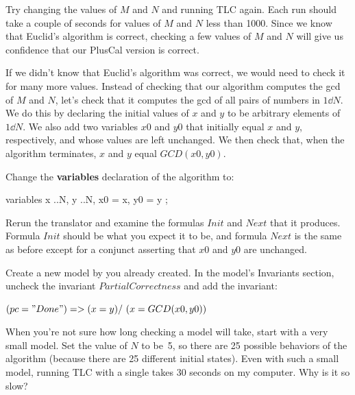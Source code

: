 \documentclass[fleqn,leqno]{article}
\begin{document}
Try changing the values of $M$ and $N$ and running TLC again.  Each
run should take a couple of seconds for values of $M$ and $N$ less
than 1000.  Since we know that Euclid's algorithm is correct, checking
a few values of $M$ and $N$ will give us confidence that our PlusCal
version is correct.  

If we didn't know that Euclid's algorithm was correct, we would need
to check it for many more values.  Instead of checking that our
algorithm computes the gcd of $M$ and $N$, let's check that it
computes the gcd of all pairs of numbers in $1\dd N$.  We do this by
declaring the initial values of $x$ and $y$ to be arbitrary elements
of $1\dd N$.  We also add two variables $x0$ and $y0$ that initially
equal $x$ and $y$, respectively, and whose values are left unchanged.
We then check that, when the algorithm terminates, $x$ and $y$ equal
$GCD(x0,y0)$.

Change the \textbf{variables} declaration of the algorithm to:
\begin{display}
\begin{nopcal}
variables x ..N, y ..N, x0 = x, y0 = y ;
\end{nopcal}
\begin{tlatex}
\end{tlatex}
\end{display}
Rerun the translator and examine the formulas $Init$ and $Next$ that
it produces.  Formula $Init$ should be what you expect it to be, and
formula $Next$ is the same as before except for a conjunct asserting
that $x0$ and $y0$ are unchanged.

Create a new model by 
   you already created.
In the model's \textsf{Invariants} section, uncheck the invariant
$PartialCorrectness$ and add the invariant:
\begin{display}
$(pc = "Done") => (x = y) /\ (x = GCD(x0, y0))$
\end{display}
When you're not sure how long checking a model will take, start with a
very small model.  Set the value of $N$ to be~5, so there are 25
possible behaviors of the algorithm (because there are 25 different
initial states).  Even with such a small model, running TLC with a
single  takes 30 seconds on my
computer.  Why is it so slow?
\end{document}
